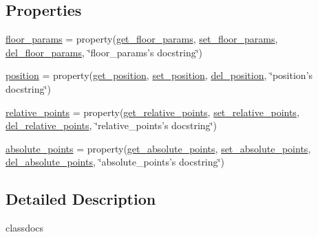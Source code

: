 \subsection*{Properties}
\begin{DoxyCompactItemize}
\item 
\hyperlink{classstructure_1_1_floor_1_1_floor_ae535ce99c9411ce059defea9d80257de}{floor\-\_\-params} = property(\hyperlink{classstructure_1_1_floor_1_1_floor_abda75539c62575846e13f28ff4a9497e}{get\-\_\-floor\-\_\-params}, \hyperlink{classstructure_1_1_floor_1_1_floor_ae16e50becd6e6cacfa7d003296662b30}{set\-\_\-floor\-\_\-params}, \hyperlink{classstructure_1_1_floor_1_1_floor_ab1fe2a2c0eb6caa489e108c046d06f33}{del\-\_\-floor\-\_\-params}, \char`\"{}floor\-\_\-params's docstring\char`\"{})
\item 
\hyperlink{classstructure_1_1_floor_1_1_floor_a2cab933c7de9a711dfaecc5547fe56e2}{position} = property(\hyperlink{classstructure_1_1_floor_1_1_floor_aea10d3e990f6d82f06c28353b5dfaaf2}{get\-\_\-position}, \hyperlink{classstructure_1_1_floor_1_1_floor_a2d18951ae4959bbd5a5a63c6015a3326}{set\-\_\-position}, \hyperlink{classstructure_1_1_floor_1_1_floor_aff388e2cd62184605f9decdb89ef8f4a}{del\-\_\-position}, \char`\"{}position's docstring\char`\"{})
\item 
\hyperlink{classstructure_1_1_floor_1_1_floor_a07b4e6babefcdc1c5e2463c09f1a5ed1}{relative\-\_\-points} = property(\hyperlink{classstructure_1_1_floor_1_1_floor_a623eed738de37bd0f7817001c9b08d03}{get\-\_\-relative\-\_\-points}, \hyperlink{classstructure_1_1_floor_1_1_floor_ad12771456a5715c69adec72a9f272d01}{set\-\_\-relative\-\_\-points}, \hyperlink{classstructure_1_1_floor_1_1_floor_a8468b17cb6d327a262ec13ae2c355f0c}{del\-\_\-relative\-\_\-points}, \char`\"{}relative\-\_\-points's docstring\char`\"{})
\item 
\hyperlink{classstructure_1_1_floor_1_1_floor_abe5a9d357004efc3e677267dbdd5043a}{absolute\-\_\-points} = property(\hyperlink{classstructure_1_1_floor_1_1_floor_a721c1508add16fe02a15f7da2fb90787}{get\-\_\-absolute\-\_\-points}, \hyperlink{classstructure_1_1_floor_1_1_floor_ad94a40179156d337ba13444ec33dd12a}{set\-\_\-absolute\-\_\-points}, \hyperlink{classstructure_1_1_floor_1_1_floor_a3ff7bde10351399770ac121a9940cad6}{del\-\_\-absolute\-\_\-points}, \char`\"{}absolute\-\_\-points's docstring\char`\"{})
\end{DoxyCompactItemize}


\subsection{Detailed Description}
\begin{DoxyVerb}classdocs
\end{DoxyVerb}
 

